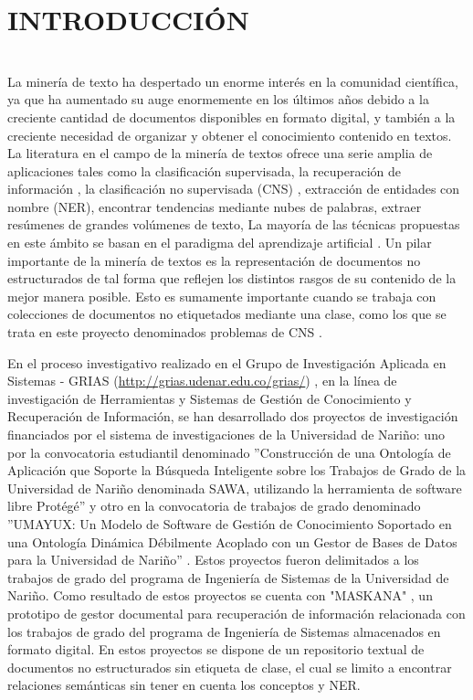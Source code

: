 \chapter*{INTRODUCCIÓN}
\\

La minería de texto ha despertado un enorme interés en la comunidad científica, ya que ha aumentado su auge enormemente en los últimos años debido a la creciente cantidad de documentos disponibles en formato digital, y también a la creciente necesidad de organizar y obtener el conocimiento contenido en textos.
La literatura en el campo de la minería de textos ofrece una serie amplia de aplicaciones tales como la clasificación supervisada, la recuperación de información , la clasificación no supervisada (CNS) , extracción de entidades con nombre (NER), encontrar tendencias mediante nubes de palabras, extraer resúmenes de grandes volúmenes de texto, La mayoría de las técnicas propuestas en este ámbito se basan en el paradigma del aprendizaje artificial \cite{sebastiani2002machine}. Un pilar importante de la minería de textos es la representación de documentos no estructurados de tal forma que reflejen los distintos rasgos de su contenido de la mejor manera posible. Esto es sumamente importante cuando se trabaja con colecciones de documentos no etiquetados mediante una clase, como los que se trata en este proyecto denominados problemas de CNS \cite{jain2010data}.

En el proceso investigativo realizado en el Grupo de Investigación Aplicada en Sistemas -  GRIAS (\textcolor{Cyan}{\underline{\url{http://grias.udenar.edu.co/grias/}}})
, en  la  línea  de  
investigación  de  Herramientas  y  Sistemas  de  Gestión  de Conocimiento  y  Recuperación  de  Información,
se  han  desarrollado  dos  proyectos  de investigación financiados por el sistema de investigaciones de la Universidad de Nariño: uno
por  la  convocatoria  estudiantil  denominado  ''Construcción  de  una  Ontología  de Aplicación  que  Soporte 
la  Búsqueda  Inteligente  sobre  los  Trabajos  de  Grado  de  la Universidad  de  Nariño  denominada  SAWA,  utilizando 
la  herramienta  de  software  libre Protégé'' \cite{cabrera2015swa} y otro en la convocatoria de trabajos de grado denominado
''UMAYUX: Un Modelo de Software de Gestión de Conocimiento Soportado en una Ontología Dinámica Débilmente Acoplado con un 
Gestor de Bases de Datos para la Universidad de Nariño'' \cite{benavides2014umayux}.  Estos  proyectos  fueron  delimitados  a  los  trabajos  de  grado 
del  programa  de Ingeniería de Sistemas de la Universidad de Nariño. Como resultado de estos proyectos se  cuenta  con  "MASKANA"  \cite{restrepo2015maskana}, 
un  prototipo  de  gestor  documental  para  recuperación  de información  relacionada  con 
los  trabajos  de  grado  del  programa  de  Ingeniería  de Sistemas  almacenados  en  formato  digital.  En estos proyectos se dispone 
de un repositorio textual de documentos no estructurados sin etiqueta de  clase, el cual se limito a encontrar relaciones semánticas
sin tener en cuenta los conceptos y NER.

